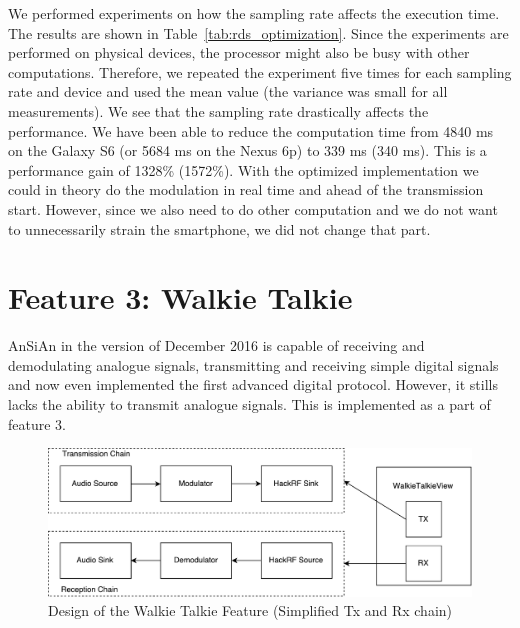 We performed experiments on how the sampling rate affects the execution time. The results are shown in Table~\ref{tab:rds_optimization}. Since the experiments are performed on physical devices, the processor might also be busy with other computations. Therefore, we repeated the experiment five times for each sampling rate and device and used the mean value (the variance was small for all measurements).  We see that the sampling rate drastically affects the performance. We have been able to reduce the computation time from 4840 ms on the Galaxy S6 (or 5684 ms on the Nexus 6p) to 339 ms (340 ms). This is a performance gain of 1328\% (1572\%).  
With the optimized implementation we could in theory do the modulation in real time and ahead of the transmission start. However, since we also need to do other computation and we do not want to unnecessarily strain the smartphone, we did not change that part. 

\section{Feature 3: Walkie Talkie} 

AnSiAn in the version of December 2016 is capable of receiving and demodulating analogue signals, transmitting and receiving simple digital signals and now even implemented the first advanced digital protocol. However, it stills lacks the ability to transmit analogue signals. This is implemented as a part of feature 3. 
\begin{figure}
	\centering
	\includegraphics[width=1.0\linewidth]{gfx/feature3_concept.pdf}
	\caption{Design of the Walkie Talkie Feature (Simplified Tx and Rx chain)}
	\label{fig:impl:f3concept}
\end{figure}


